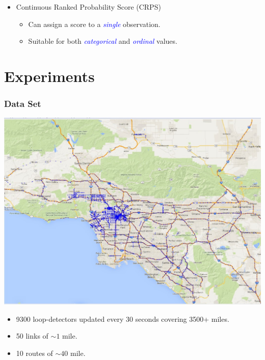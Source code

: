 \documentclass[t]{beamer}
\begin{document}
\begin{frame}
\begin{itemize}
\item<4-> Continuous Ranked Probability Score (CRPS)
\begin{itemize}
\item<4-> Can assign a score to a \textcolor{blue}{\emph{single}} observation.
\item<4-> Suitable for both \textcolor{blue}{\emph{categorical}} and \textcolor{blue}{\emph{ordinal}} values.
\end{itemize}
\end{itemize}
\end{frame}

\section{Experiments}

\begin{frame}\frametitle{Data Set}
\vspace{-0.25in}
\begin{center}
	\includegraphics[scale=0.4]{LA-map.jpg}
\end{center}
\begin{itemize}
\item 9300 loop-detectors updated every 30 seconds covering 3500+ miles.
\item<2-> 50 links of $\sim 1$ mile.
\item<3-> 10 routes of $\sim 40$ mile.
\end{itemize}
\end{frame}
\end{document}
